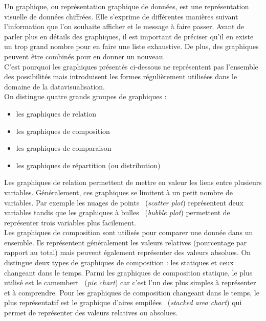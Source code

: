 Un graphique, ou représentation graphique de données, est une représentation visuelle de données chiffrées. Elle s'exprime de différentes manières suivant l'information que l'on souhaite afficher et le message à faire passer. Avant de parler plus en détails des graphiques, il est important de préciser qu'il en existe un trop grand nombre pour en faire une liste exhaustive. De plus, des graphiques peuvent être combinés pour en donner un nouveau.\\

C'est pourquoi les graphiques présentés ci-dessous ne représentent pas l'ensemble des possibilités mais introduisent les formes régulièrement utilisées dans le domaine de la datavisualisation.\\

On distingue quatre grands groupes de graphiques : 
\begin{itemize}
\item les graphiques de relation
\item les graphiques de composition
\item les graphiques de comparaison
\item les graphiques de répartition (ou distribution)
\end{itemize}
\bigskip
Les graphiques de relation permettent de mettre en valeur les liens entre plusieurs variables. Généralement, ces graphiques se limitent à un petit nombre de variables. Par exemple les nuages de points~\cite{scatterplot} (\textit{scatter plot}) représentent deux variables tandis que les graphiques à bulles~\cite{bubbleplot} (\textit{bubble plot}) permettent de représenter trois variables plus facilement.\\

Les graphiques de composition sont utilisés pour comparer une donnée dans un ensemble. Ils représentent généralement les valeurs relatives (pourcentage par rapport au total) mais peuvent également représenter des valeurs absolues. On distingue deux types de graphiques de composition : les statiques et ceux changeant dans le temps. Parmi les graphiques de composition statique, le plus utilisé est le camembert~\cite{piechart} (\textit{pie chart}) car c'est l'un des plus simples à représenter et à comprendre. Pour les graphiques de composition changeant dans le temps, le plus représentatif est le graphique d'aires empilées~\cite{stackedareaplot} (\textit{stacked area chart}) qui permet de représenter des valeurs relatives ou absolues.\\


